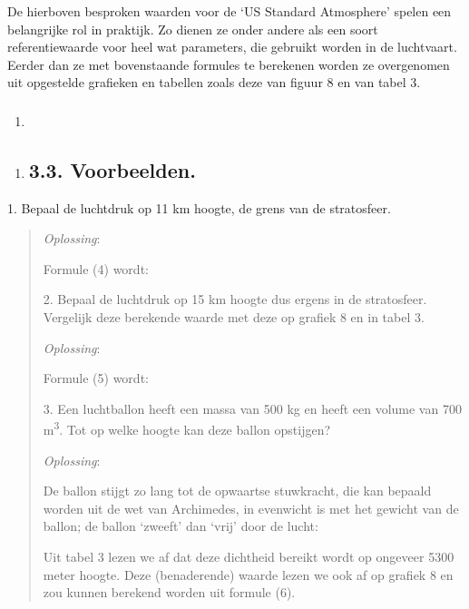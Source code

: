 \documentclass[]{article}
\begin{document}
De hierboven besproken waarden voor de `US Standard Atmosphere' spelen
een belangrijke rol in praktijk. Zo dienen ze onder andere als een soort
referentiewaarde voor heel wat parameters, die gebruikt worden in de
luchtvaart. Eerder dan ze met bovenstaande formules te berekenen worden
ze overgenomen uit opgestelde grafieken en tabellen zoals deze van
figuur 8 en van tabel 3.

\begin{enumerate}
\item
  \subsubsection{}\label{section-12}
\end{enumerate}

\begin{enumerate}
\item
  \subsection{}\label{section-13}

  \subsection{3.3. Voorbeelden.}\label{voorbeelden.-2}
\end{enumerate}

1. Bepaal de luchtdruk op 11 km hoogte, de grens van de stratosfeer.

\begin{quote}
\emph{Oplossing}:

Formule (4) wordt:

2. Bepaal de luchtdruk op 15 km hoogte dus ergens in de stratosfeer.
Vergelijk deze berekende waarde met deze op grafiek 8 en in tabel 3.

\emph{Oplossing}:

Formule (5) wordt:

3. Een luchtballon heeft een massa van 500 kg en heeft een volume van
700 m\textsuperscript{3}. Tot op welke hoogte kan deze ballon opstijgen?

\emph{Oplossing}:

De ballon stijgt zo lang tot de opwaartse stuwkracht, die kan bepaald
worden uit de wet van Archimedes, in evenwicht is met het gewicht van de
ballon; de ballon `zweeft' dan `vrij' door de lucht:

Uit tabel 3 lezen we af dat deze dichtheid bereikt wordt op ongeveer
5300 meter hoogte. Deze (benaderende) waarde lezen we ook af op grafiek
8 en zou kunnen berekend worden uit formule (6).
\end{quote}
\end{document}
